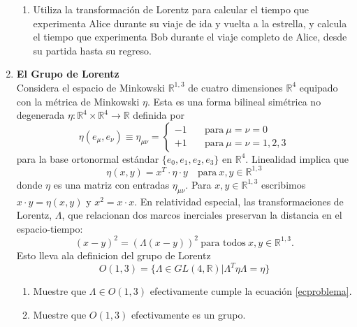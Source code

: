 \documentclass[../main]{subfiles}
\begin{document}
\begin{adjustwidth}{0pt}{-100pt}
\begin{enumerate}
\begin{enumerate}
        \item Utiliza la transformación de Lorentz para calcular el tiempo que experimenta Alice durante su viaje de ida y vuelta a la estrella, y calcula el tiempo que experimenta Bob durante el viaje completo de Alice, desde su partida hasta su regreso.
    \end{enumerate}
    \item \textbf{El Grupo de Lorentz}\\
    Considera el espacio de Minkowski $\mathbb{R}^{1, 3}$ de cuatro dimensiones $\mathbb{R}^4$ equipado con la métrica de Minkowski $\eta$. Esta es una forma bilineal simétrica no degenerada $\eta: \mathbb{R}^4 \times \mathbb{R}^4 \rightarrow \mathbb{R}$ definida por 
    \begin{equation}
        \eta(e_{\mu}, e_{\nu})\equiv \eta_{\mu\nu}=
        \left\{
        \begin{aligned}
            -1 &\quad \text{para} \ \mu=\nu=0\\
            +1 &\quad \text{para} \ \mu=\nu=1, 2, 3
        \end{aligned}
        \right.
    \end{equation}
    para la base ortonormal estándar $\{e_0, e_1, e_2, e_3\}$ en $\mathbb{R}^4$. Linealidad implica que 
    \begin{equation}
        \eta(x, y)=x^T\cdot \eta \cdot y \quad \text{para} \ x,y \in \mathbb{R}^{1, 3}
    \end{equation}
    donde $\eta$ es una matriz con entradas $\eta_{\mu\nu}$. Para $x, y \in \mathbb{R}^{1, 3}$ escribimos $x\cdot y=\eta(x, y)$ y $x^2=x\cdot x$. En relatividad especial, las transformaciones de Lorentz, $\Lambda$, que relacionan dos marcos inerciales preservan la distancia en el espacio-tiempo:
    \begin{equation}
        (x-y)^2=(\Lambda(x-y))^2 \ \text{para todos} \ x, y \in \mathbb{R}^{1, 3}.
        \label{ecproblema}
    \end{equation} 
    Esto lleva ala definicion del grupo de Lorentz 
    \begin{equation}
        O(1, 3)=\{\Lambda \in GL(4, \mathbb{R})| \Lambda^T\eta \Lambda=\eta \}
    \end{equation}
    \begin{enumerate}
        \item Muestre que $\Lambda \in O(1,3)$ efectivamente cumple la ecuación \eqref{ecproblema}.
        \item Muestre que $O(1, 3)$ efectivamente es un grupo.

\end{enumerate}
\end{enumerate}
\end{adjustwidth}
\end{document}
